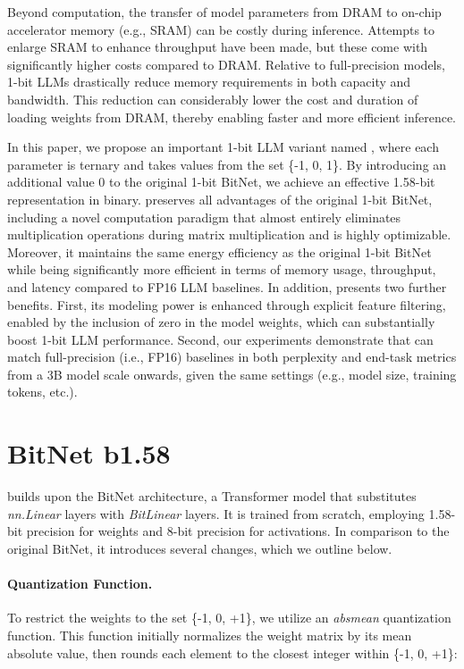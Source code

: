 Beyond computation, the transfer of model parameters from DRAM to on-chip accelerator memory (e.g., SRAM) can be costly during inference. Attempts to enlarge SRAM to enhance throughput have been made, but these come with significantly higher costs compared to DRAM. Relative to full-precision models, 1-bit LLMs drastically reduce memory requirements in both capacity and bandwidth. This reduction can considerably lower the cost and duration of loading weights from DRAM, thereby enabling faster and more efficient inference.

In this paper, we propose an important 1-bit LLM variant named \textbf{}, where each parameter is ternary and takes values from the set \{-1, 0, 1\}. By introducing an additional value 0 to the original 1-bit BitNet, we achieve an effective 1.58-bit representation in binary.  preserves all advantages of the original 1-bit BitNet, including a novel computation paradigm that almost entirely eliminates multiplication operations during matrix multiplication and is highly optimizable. Moreover, it maintains the same energy efficiency as the original 1-bit BitNet while being significantly more efficient in terms of memory usage, throughput, and latency compared to FP16 LLM baselines. In addition,  presents two further benefits. First, its modeling power is enhanced through explicit feature filtering, enabled by the inclusion of zero in the model weights, which can substantially boost 1-bit LLM performance. Second, our experiments demonstrate that  can match full-precision (i.e., FP16) baselines in both perplexity and end-task metrics from a 3B model scale onwards, given the same settings (e.g., model size, training tokens, etc.).

\section{BitNet b1.58}

 builds upon the BitNet architecture, a Transformer model that substitutes \emph{nn.Linear} layers with \emph{BitLinear} layers. It is trained from scratch, employing 1.58-bit precision for weights and 8-bit precision for activations. In comparison to the original BitNet, it introduces several changes, which we outline below.

\paragraph{Quantization Function.} To restrict the weights to the set \{-1, 0, +1\}, we utilize an \emph{absmean} quantization function. This function initially normalizes the weight matrix by its mean absolute value, then rounds each element to the closest integer within \{-1, 0, +1\}:

